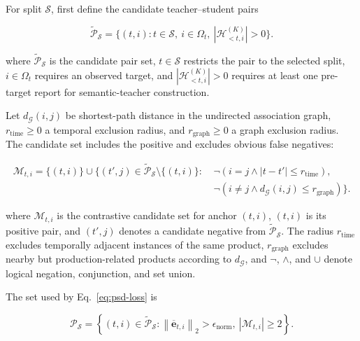 \documentclass[letterpaper]{article} %
\begin{document}
For split \(\mathcal S\), first define the candidate teacher--student pairs

\begin{equation}
\widetilde{\mathcal P}_{\mathcal S}
=
\{(t,i):t\in\mathcal S,\ i\in\Omega_t,\
|\mathcal H_{<t,i}^{(K)}|>0\}.
\label{eq:app-distillation-pairs}
\end{equation}

where \(\widetilde{\mathcal P}_{\mathcal S}\) is the candidate pair set, \(t\in\mathcal S\) restricts the pair to the selected split, \(i\in\Omega_t\) requires an observed target, and \(|\mathcal H_{<t,i}^{(K)}|>0\) requires at least one pre-target report for semantic-teacher construction.

Let \(d_{\mathcal G}(i,j)\) be shortest-path distance in the undirected association graph, \(r_{\mathrm{time}}\geq0\) a temporal exclusion radius, and \(r_{\mathrm{graph}}\geq0\) a graph exclusion radius. The candidate set includes the positive and excludes obvious false negatives:

\begin{equation}
\begin{aligned}
\mathcal M_{t,i}
=\{(t,i)\}\cup
\big\{(t',j)\in\widetilde{\mathcal P}_{\mathcal S}\setminus\{(t,i)\}:\
&\neg(i=j\land |t-t'|\leq r_{\mathrm{time}}),\\
&\neg(i\neq j\land d_{\mathcal G}(i,j)\leq r_{\mathrm{graph}})
\big\}.
\end{aligned}
\label{eq:app-negative-mask}
\end{equation}

where \(\mathcal M_{t,i}\) is the contrastive candidate set for anchor \((t,i)\), \((t,i)\) is its positive pair, and \((t',j)\) denotes a candidate negative from \(\widetilde{\mathcal P}_{\mathcal S}\). The radius \(r_{\mathrm{time}}\) excludes temporally adjacent instances of the same product, \(r_{\mathrm{graph}}\) excludes nearby but production-related products according to \(d_{\mathcal G}\), and \(\neg\), \(\land\), and \(\cup\) denote logical negation, conjunction, and set union.

The set used by Eq.~\ref{eq:psd-loss} is

\begin{equation}
\mathcal P_{\mathcal S}
=
\left\{
(t,i)\in\widetilde{\mathcal P}_{\mathcal S}:
\left\|\overline{\mathbf e}_{t,i}\right\|_2
>\epsilon_{\mathrm{norm}},
\ |\mathcal M_{t,i}|\geq2
\right\}.
\label{eq:app-eligible-distillation-pairs}
\end{equation}
\end{document}
